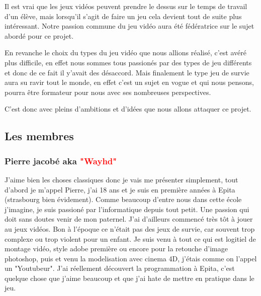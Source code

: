 \documentclass{article}
\begin{document}
\par
Il est vrai que les jeux vidéos peuvent prendre le dessus sur le temps de travail  d'un élève, mais lorsqu'il s'agit de faire un jeu cela devient tout de suite plus intéressant. Notre passion commune du  jeu  vidéo aura été fédératrice sur le sujet  abordé pour ce projet.
\newline

\par
En  revanche le choix du types du jeu vidéo que nous allions réalisé, c'est avéré plus difficile, en effet nous sommes tous passionés par des types de jeu différents et donc de  ce fait il y'avait des désaccord. Mais finalement le type jeu de survie aura su ravir tout le monde, en effet c'est un sujet  en vogue et qui nous pensons, pourra être formateur pour nous avec ses nombreuses perspectives. 
\newline

\par
C'est donc avec pleins d'ambitions et d'idées que nous allons attaquer ce  projet.



\newpage
\subsection{Les  membres}
\subsubsection{Pierre jacobé aka \textcolor{red}{"Wayhd"}}

\par
J'aime bien les choses classiques donc je vais me présenter simplement, tout d'abord je m'appel Pierre, j'ai 18 ans et je suis  en première années à  Epita  (strasbourg bien évidement). Comme beaucoup  d'entre nous dans cette école j'imagine, je suis passioné par l'informatique depuis tout petit. Une passion qui doit sans doutes venir de mon paternel. J'ai d'ailleurs commencé très tôt à jouer au jeux vidéos. Bon à l'époque ce n'était pas des jeux de survie, car souvent trop complexe ou trop violent pour un enfant. Je suis venu à tout ce qui est logitiel de montage vidéo, style adobe première ou encore pour la retouche d'image photoshop, puis et venu la modelisation avec cinema 4D, j'étais comme on l'appel un "Youtubeur". J'ai réellement découvert la programmation à Epita, c'est quelque chose que j'aime beaucoup et que j'ai hate de mettre en pratique dans le jeu.
\newline
\end{document}
